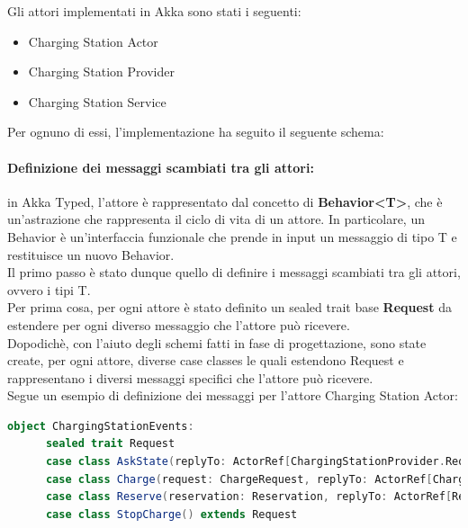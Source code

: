 Gli attori implementati in Akka sono stati i seguenti:
\begin{itemize}
      \item Charging Station Actor
      \item Charging Station Provider
      \item Charging Station Service
\end{itemize}

Per ognuno di essi, l'implementazione ha seguito il seguente schema:\\

\paragraph{Definizione dei messaggi scambiati tra gli attori:}
in Akka Typed, l'attore è rappresentato dal concetto di \textbf{Behavior<T>}, che è un'astrazione che rappresenta il ciclo di vita di un attore. In particolare, un Behavior è un'interfaccia funzionale che prende in input un messaggio di tipo T e restituisce un nuovo Behavior.\\
Il primo passo è stato dunque quello di definire i messaggi scambiati tra gli attori, ovvero i tipi T.\\
Per prima cosa, per ogni attore è stato definito un sealed trait base \textbf{Request} da estendere per ogni diverso messaggio che l'attore può ricevere.\\
Dopodichè, con l'aiuto degli schemi fatti in fase di progettazione, sono state create, per ogni attore, diverse case classes le quali estendono Request e rappresentano i diversi messaggi specifici che l'attore può ricevere.\\
Segue un esempio di definizione dei messaggi per l'attore Charging Station Actor:
\begin{lstlisting}[language=scala]
object ChargingStationEvents:
      sealed trait Request
      case class AskState(replyTo: ActorRef[ChargingStationProvider.Request]) extends Request
      case class Charge(request: ChargeRequest, replyTo: ActorRef[ChargeRequestResult]) extends Request
      case class Reserve(reservation: Reservation, replyTo: ActorRef[ReservationResult]) extends Request
      case class StopCharge() extends Request
\end{lstlisting}

